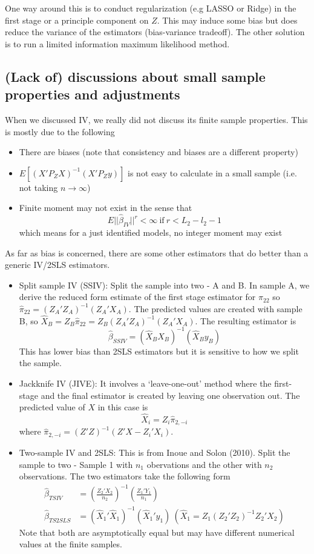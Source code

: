 \documentclass[12pt]{article}
\theoremstyle{definition}
\theoremstyle{property}
\theoremstyle{assumption}
\theoremstyle{example}
\theoremstyle{comment}
\begin{document}
One way around this is to conduct regularization (e.g LASSO or Ridge) in the first stage or a principle component on $Z$. This may induce some bias but does reduce the variance of the estimators (bias-variance tradeoff). The other solution is to run a limited information maximum likelihood method. 

\subsection{(Lack of) discussions about small sample properties and adjustments}
When we discussed IV, we really did not discuss its finite sample properties. This is mostly due to the following
\begin{itemize}
\item There are biases (note that consistency and biases are a different property)
\item $E[(X'P_ZX)^{-1}(X'P_Zy)]$ is not easy to calculate in a small sample (i.e. not taking $n\to\infty$)
\item Finite moment may not exist in the sense that
\[
E||\hat{\beta}_{IV}||^r <\infty \ \text{if}\ r<L_2-l_2-1
\]
which means for a just identified models, no integer moment may exist
\end{itemize}
As far as bias is concerned, there are some other estimators that do better than a generic IV/2SLS estimators. 
\begin{itemize}
\item Split sample IV (SSIV): Split the sample into two - A and B. In sample A, we derive the reduced form estimate of the first stage estimator for $\pi_{22}$ so $\hat{\pi}_{22}=(Z_A'Z_A)^{-1}(Z_A'X_A)$. The predicted values are created with sample B, so $\widehat{X}_B=Z_B\hat{\pi}_{22}=Z_B(Z_A'Z_A)^{-1}(Z_A'X_A)$. The resulting estimator is
\[
\hat{\beta}_{SSIV}=(\widehat{X}_BX_B)^{-1}(\widehat{X}_By_B)
\]
This has lower bias than 2SLS estimators but it is sensitive to how  we split the sample.
\item Jackknife IV (JIVE): It involves a `leave-one-out' method where the first-stage and the final estimator is created by leaving one observation out. The predicted value of $X$ in this case is
\[
\widehat{X}_i = Z_i\hat{\pi}_{2,-i}
\]
where $\hat{\pi}_{2,-i}=(Z'Z)^{-1}(Z'X-Z_i'X_i)$. 
\item Two-sample IV and 2SLS: This is from Inoue and Solon (2010). Split the sample to two - Sample 1 with $n_1$ obervations and the other with $n_2$ observations. The two estimators take the following form
\[
\begin{aligned}
\hat{\beta}_{TSIV}&=\left(\frac{Z_2'X_2}{n_2}\right)^{-1}\left(\frac{Z_1'Y_1}{n_1}\right)\\
\hat{\beta}_{TS2SLS}&=(\widehat{X}_1'\widehat{X}_1)^{-1}(\widehat{X}_1'y_1) \ (\widehat{X}_1=Z_1(Z_2'Z_2)^{-1}Z_2'X_2)
\end{aligned}
\]
Note that both are asymptotically equal but may have different numerical values at the finite samples. 
\end{itemize}
\end{document}
